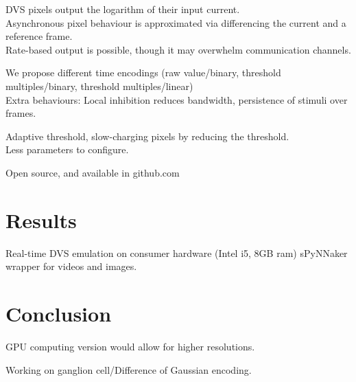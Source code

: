 \documentclass[]{article}
\begin{document}
DVS pixels output the logarithm of their input current.\\

Asynchronous pixel behaviour is approximated via differencing the current and a reference frame. \\

Rate-based output is possible, though it may overwhelm communication channels.

We propose different time encodings (raw value/binary, threshold multiples/binary, threshold multiples/linear)\\

Extra behaviours: Local inhibition reduces bandwidth, persistence of stimuli over frames. 

Adaptive threshold, slow-charging pixels by reducing the threshold.\\
Less parameters to configure.

Open source, and available in github.com\\

\section{Results}

Real-time DVS emulation on consumer hardware (Intel i5, 8GB ram)
sPyNNaker wrapper for videos and images.

\section{Conclusion}

GPU computing version would allow for higher resolutions.

Working on ganglion cell/Difference of Gaussian encoding.

\printbibliography
\end{document}
